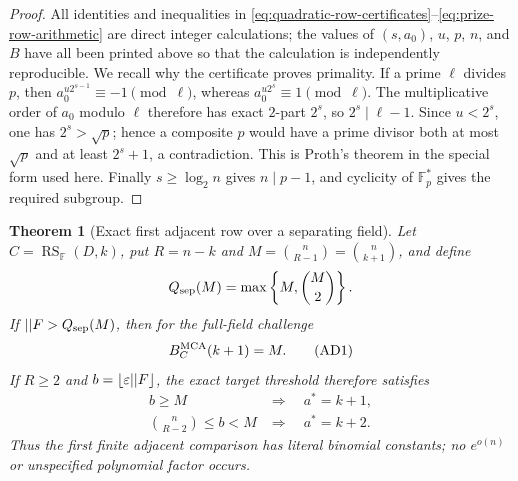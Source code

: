 \documentclass[11pt,a4paper]{amsart}
\numberwithin{equation}{section}
\newtheorem{theorem}{Theorem}[section]
\theoremstyle{remark}
\DeclareMathOperator{\RS}{RS}\DeclareMathOperator{\MCA}{MCA}\DeclareMathOperator{\CA}{CA}
\newcommand{\F}{\mathbb F}\newcommand{\B}{\mathbb B}\newcommand{\K}{\mathbb K}\newcommand{\Z}{\mathbb Z}
\begin{document}
\begin{proof}
All identities and inequalities in
\eqref{eq:quadratic-row-certificates}--\eqref{eq:prize-row-arithmetic}
are direct
integer calculations; the values of \((s,a_0)\), \(u\), \(p\), \(n\),
and \(B\) have all been printed above so that the calculation is
independently reproducible.  We recall why the certificate proves
primality.  If a prime \(\ell\) divides \(p\), then
\(a_0^{u2^{s-1}}\equiv-1\pmod\ell\), whereas
\(a_0^{u2^s}\equiv1\pmod\ell\).  The multiplicative order of \(a_0\)
modulo \(\ell\) therefore has exact \(2\)-part \(2^s\), so
\(2^s\mid\ell-1\).  Since \(u<2^s\), one has \(2^s>\sqrt p\); hence a
composite \(p\) would have a prime divisor both at most \(\sqrt p\) and
at least \(2^s+1\), a contradiction.  This is Proth's theorem in the
special form used here.  Finally \(s\ge\log_2 n\) gives \(n\mid p-1\),
and cyclicity of \(\F_p^*\) gives the required subgroup.
\end{proof}

\begin{theorem}[Exact first adjacent row over a separating field]
\label{thm:exact-first-adjacent-row}
Let \(C=\RS_\F(D,k)\), put \(R=n-k\) and
\(M=\binom n{R-1}=\binom n{k+1}\), and define
\[
                    Q_{\rm sep}(M)=\max\left\{M,\binom M2\right\}.
\]
If \(\abs\F>Q_{\rm sep}(M)\), then for the full-field challenge
\[
                         B_C^{\rm MCA}(k+1)=M.      \tag{AD1}
\]
If \(R\ge2\) and \(b=\floor{\eps\abs\F}\), the exact target threshold
therefore satisfies
\[
 \begin{array}{ll}
 b\ge M &\Longrightarrow\quad a^*=k+1,\\[2mm]
 \displaystyle\binom n{R-2}\le b<M
   &\Longrightarrow\quad a^*=k+2.
 \end{array}                                       \tag{AD2}
\]
Thus the first finite adjacent comparison has literal binomial constants;
no \(e^{o(n)}\) or unspecified polynomial factor occurs.
\end{theorem}
\end{document}
